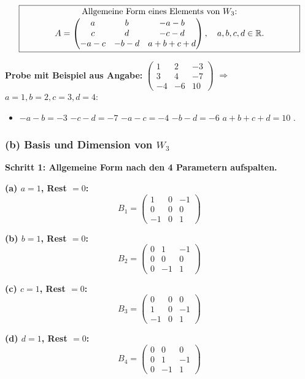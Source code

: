 \documentclass[a4paper,12pt]{article}
\begin{document}
\[
\fbox{\parbox{0.93\textwidth}{\centering
Allgemeine Form eines Elements von $W_3$:\\[2pt]
$A = \begin{pmatrix} a & b & -a-b \\ c & d & -c-d \\ -a-c & -b-d & a+b+c+d \end{pmatrix}, \quad a, b, c, d \in \mathbb{R}.$
}}
\]

\textbf{Probe mit Beispiel aus Angabe:} $\begin{pmatrix} 1 & 2 & -3 \\ 3 & 4 & -7 \\ -4 & -6 & 10 \end{pmatrix}$ $\Rightarrow$ $a=1, b=2, c=3, d=4$:
\begin{itemize}[nosep, leftmargin=*]
\item $-a-b = -3$ \checkmark\; $-c-d = -7$ \checkmark\; $-a-c = -4$ \checkmark\; $-b-d = -6$ \checkmark\; $a+b+c+d = 10$ \checkmark.
\end{itemize}

\subsubsection*{(b) Basis und Dimension von $W_3$}

\textbf{Schritt 1: Allgemeine Form nach den 4 Parametern aufspalten.}

\textbf{(a) $a = 1$, Rest $= 0$:}
\[
B_1 = \begin{pmatrix} 1 & 0 & -1 \\ 0 & 0 & 0 \\ -1 & 0 & 1 \end{pmatrix}
\]

\textbf{(b) $b = 1$, Rest $= 0$:}
\[
B_2 = \begin{pmatrix} 0 & 1 & -1 \\ 0 & 0 & 0 \\ 0 & -1 & 1 \end{pmatrix}
\]

\textbf{(c) $c = 1$, Rest $= 0$:}
\[
B_3 = \begin{pmatrix} 0 & 0 & 0 \\ 1 & 0 & -1 \\ -1 & 0 & 1 \end{pmatrix}
\]

\textbf{(d) $d = 1$, Rest $= 0$:}
\[
B_4 = \begin{pmatrix} 0 & 0 & 0 \\ 0 & 1 & -1 \\ 0 & -1 & 1 \end{pmatrix}
\]
\end{document}

